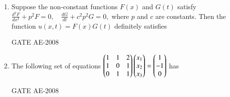 \documentclass[journal,12pt,onecolumn]{IEEEtran}
\theoremstyle{remark}
\begin{document}
\begin{enumerate}
    \quad

    \item \quad Suppose the non-constant functions $F(x)$ and $G(t)$ satisfy
    $
    \frac{d^2 F}{dx^2} + p^2 F = 0,\quad \frac{dG}{dt} + c^2 p^2 G = 0,
    $
    where $p$ and $c$ are constants. Then the function $u(x,t) = F(x)G(t)$ definitely satisfies\\
    \begin{enumerate}
    \end{enumerate}
    \hfill{GATE AE-2008}

    \quad

        \item The following set of equations
    $
    \begin{pmatrix}
    1 & 1 & 2 \\
    1 & 0 & 1 \\
    0 & 1 & 1 
    \end{pmatrix}
    \begin{pmatrix}
    x_1 \\
    x_2 \\
    x_3
    \end{pmatrix}
    =
    \begin{pmatrix}
    1 \\
    -1 \\
    0
    \end{pmatrix}
    $
    has\\
    \begin{enumerate}
    \end{enumerate}
    \hfill{GATE AE-2008}

    \quad


\end{enumerate}
\end{document}
